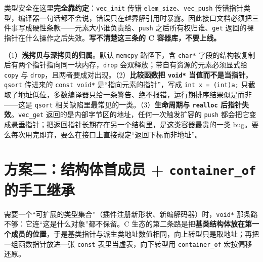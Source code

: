 \documentclass[12pt,a4paper,fontset=fandol]{ctexbook}
\newcommand{\kw}[1]{\texttt{#1}}
\begin{document}
类型安全在这里\textbf{完全靠约定}：\kw{vec\_init} 传错 \kw{elem\_size}、\kw{vec\_push} 传错指针类型，编译器一句话都不会说，错误只在越界解引用时暴露。因此接口文档必须把三件事写成硬性条款——元素大小谁负责给、\kw{push} 之后所有权归谁、\kw{get} 返回的裸指针在什么操作之后失效。\textbf{写不清楚这三条的 C 容器库，不要上线。}

\begin{warning}[title={这套写法的三个典型坑}]
（1）\textbf{浅拷贝与深拷贝的归属}。默认 \kw{memcpy} 路径下，含 \kw{char*} 字段的结构被复制后有两个指针指向同一块内存，\kw{drop} 会双释放；带自有资源的元素必须显式给 \kw{copy} 与 \kw{drop}，且两者要成对出现。（2）\textbf{比较函数把 \kw{void*} 当值而不是当指针}。\kw{qsort} 传进来的 \kw{const void*} 是“指向元素的指针”，写成 \kw{int x = (int)a;} 只截取了地址低位，多数编译器只给一条警告、绝不报错，运行期排序结果似是而非——这是 \kw{qsort} 相关缺陷里最常见的一类。（3）\textbf{生命周期与 \kw{realloc} 后指针失效}。\kw{vec\_get} 返回的是内部字节区的地址，任何一次触发扩容的 \kw{push} 都会把它变成悬垂指针；把返回指针长期存在另一个结构里，是这类容器最贵的一类 bug。要么每次用完即弃，要么在接口上直接规定“返回下标而非地址”。
\end{warning}

\section{方案二：结构体首成员 + \kw{container\_of} 的手工继承}

需要一个“可扩展的类型集合”（插件注册新形状、新编解码器）时，\kw{void*} 那条路不够：它连“这是什么对象”都不保留。C 生态的第二条路是把\textbf{基类结构体放在第一个成员的位置}，于是基类指针与派生类地址数值相同，向上转型只是取地址；再把一组函数指针放进一张 \kw{const} 表里当虚表，向下转型用 \kw{container\_of} 宏按偏移还原。
\end{document}

